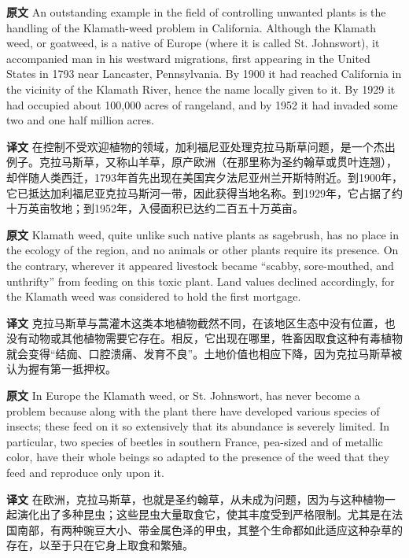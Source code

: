 \documentclass[UTF8,zihao=-4]{ctexart}
\begin{document}
\noindent\textbf{原文} An outstanding example in the field of controlling unwanted plants is the handling of the Klamath-weed problem in California. Although the Klamath weed, or goatweed, is a native of Europe (where it is called St. Johnswort), it accompanied man in his westward migrations, first appearing in the United States in 1793 near Lancaster, Pennsylvania. By 1900 it had reached California in the vicinity of the Klamath River, hence the name locally given to it. By 1929 it had occupied about 100,000 acres of rangeland, and by 1952 it had invaded some two and one half million acres.
\par
\noindent\textbf{译文} 在控制不受欢迎植物的领域，加利福尼亚处理克拉马斯草问题，是一个杰出例子。克拉马斯草，又称山羊草，原产欧洲（在那里称为圣约翰草或贯叶连翘），却伴随人类西迁，1793年首先出现在美国宾夕法尼亚州兰开斯特附近。到1900年，它已抵达加利福尼亚克拉马斯河一带，因此获得当地名称。到1929年，它占据了约十万英亩牧地；到1952年，入侵面积已达约二百五十万英亩。
\par\medskip

\noindent\textbf{原文} Klamath weed, quite unlike such native plants as sagebrush, has no place in the ecology of the region, and no animals or other plants require its presence. On the contrary, wherever it appeared livestock became ``scabby, sore-mouthed, and unthrifty'' from feeding on this toxic plant. Land values declined accordingly, for the Klamath weed was considered to hold the first mortgage.
\par
\noindent\textbf{译文} 克拉马斯草与蒿灌木这类本地植物截然不同，在该地区生态中没有位置，也没有动物或其他植物需要它存在。相反，它出现在哪里，牲畜因取食这种有毒植物就会变得“结痂、口腔溃痛、发育不良”。土地价值也相应下降，因为克拉马斯草被认为握有第一抵押权。
\par\medskip

\noindent\textbf{原文} In Europe the Klamath weed, or St. Johnswort, has never become a problem because along with the plant there have developed various species of insects; these feed on it so extensively that its abundance is severely limited. In particular, two species of beetles in southern France, pea-sized and of metallic color, have their whole beings so adapted to the presence of the weed that they feed and reproduce only upon it.
\par
\noindent\textbf{译文} 在欧洲，克拉马斯草，也就是圣约翰草，从未成为问题，因为与这种植物一起演化出了多种昆虫；这些昆虫大量取食它，使其丰度受到严格限制。尤其是在法国南部，有两种豌豆大小、带金属色泽的甲虫，其整个生命都如此适应这种杂草的存在，以至于只在它身上取食和繁殖。
\par\medskip
\end{document}
